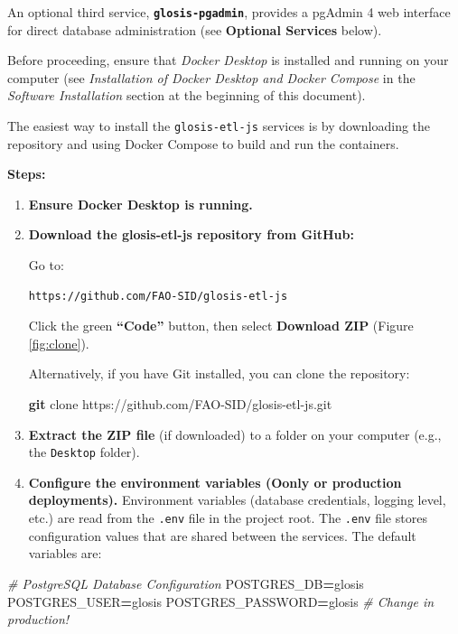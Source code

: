 \documentclass[
  10pt,
  b5paper,
  oneside]{book}
\newenvironment{Shaded}{\begin{snugshade}}{\end{snugshade}}
\newcommand{\CommentTok}[1]{\textcolor[rgb]{0.56,0.35,0.01}{\textit{#1}}}
\newcommand{\FunctionTok}[1]{\textcolor[rgb]{0.13,0.29,0.53}{\textbf{#1}}}
\newcommand{\NormalTok}[1]{#1}
\newcommand{\OperatorTok}[1]{\textcolor[rgb]{0.81,0.36,0.00}{\textbf{#1}}}
\newcommand{\VariableTok}[1]{\textcolor[rgb]{0.00,0.00,0.00}{#1}}
\begin{document}
An optional third service, \textbf{\texttt{glosis-pgadmin}}, provides a pgAdmin 4 web interface for direct database administration (see \textbf{Optional Services} below).

Before proceeding, ensure that \emph{Docker Desktop} is installed and running on your computer (see \emph{Installation of Docker Desktop and Docker Compose} in the \emph{Software Installation} section at the beginning of this document).

The easiest way to install the \texttt{glosis-etl-js} services is by downloading the repository and using Docker Compose to build and run the containers.

\textbf{Steps:}

\begin{enumerate}
\def\labelenumi{\arabic{enumi}.}
\item
  \textbf{Ensure Docker Desktop is running.}
\item
  \textbf{Download the glosis-etl-js repository from GitHub:}

  Go to:

\begin{verbatim}
https://github.com/FAO-SID/glosis-etl-js
\end{verbatim}

  Click the green \textbf{``Code''} button, then select \textbf{Download ZIP} (Figure \ref{fig:clone}).

  Alternatively, if you have Git installed, you can clone the repository:

\begin{Shaded}
\begin{Highlighting}[]
\FunctionTok{git}\NormalTok{ clone https://github.com/FAO{-}SID/glosis{-}etl{-}js.git}
\end{Highlighting}
\end{Shaded}
\item
  \textbf{Extract the ZIP file} (if downloaded) to a folder on your computer (e.g., the \texttt{Desktop} folder).
\item
  \textbf{Configure the environment variables (Oonly or production deployments).}
  Environment variables (database credentials, logging level, etc.) are read from the \texttt{.env} file in the project root. The \texttt{.env} file stores configuration values that are shared between the services. The default variables are:
\end{enumerate}

\begin{Shaded}
\begin{Highlighting}[]
\CommentTok{\# PostgreSQL Database Configuration}
\VariableTok{POSTGRES\_DB}\OperatorTok{=}\NormalTok{glosis}
\VariableTok{POSTGRES\_USER}\OperatorTok{=}\NormalTok{glosis}
\VariableTok{POSTGRES\_PASSWORD}\OperatorTok{=}\NormalTok{glosis    }\CommentTok{\# Change in production!}
\end{Highlighting}
\end{Shaded}
\end{document}

